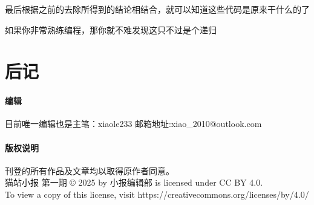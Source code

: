 \documentclass[UTF8,fontset=fandol]{article}
\begin{document}
	最后根据之前的去除所得到的结论相结合，就可以知道这些代码是原来干什么的了
	
	如果你非常熟练编程，那你就不难发现这只不过是个递归
	
	\section{后记}
	\paragraph{编辑} 目前唯一编辑也是主笔：xiaole233 邮箱地址:xiao\_2010@outlook.com
	\paragraph{版权说明} 刊登的所有作品及文章均以取得原作者同意。\\ 
	猫站小报 第一期  © 2025 by 小报编辑部 is licensed under CC BY 4.0.\\ To view a copy of this license, visit https://creativecommons.org/licenses/by/4.0/
	
\end{document}
